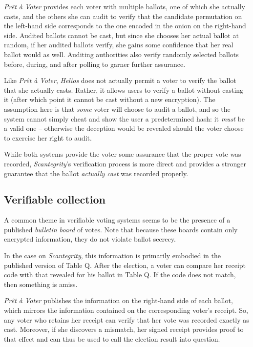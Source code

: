 \documentclass[10pt,twocolumn]{article}
\newcommand{\term}[1]{\textit{#1}}
\newcommand{\preta}{Pr\^{e}t \`{a}}
\newcommand{\pv}{\preta{} Voter}
\begin{document}
\term{\pv{}} provides each voter with multiple ballots, one of which she actually casts, and the others
she can audit to verify that the candidate permutation on the left-hand side corresponds to the one
encoded in the onion on the right-hand side. Audited ballots cannot be cast, but since she chooses
her actual ballot at random, if her audited ballots verify, she gains some confidence that
her real ballot would as well. Auditing authorities also verify randomly selected ballots before,
during, and after polling to garner further assurance.

Like \term{\pv{}}, \term{Helios} does not actually permit a voter to verify the ballot that she actually casts. Rather, it
allows users to verify a ballot without casting it (after which point it cannot be cast without
a new encryption). The assumption here is that \emph{some} voter will choose to audit a ballot, and
so the system cannot simply cheat and show the user a predetermined hash: it \emph{must} be a valid
one -- otherwise the deception would be revealed should the voter choose to exercise her right
to audit.

While both systems provide the voter some assurance that the proper vote was recorded, \term{Scantegrity}'s
verification process is more direct and provides a stronger guarantee that the ballot \emph{actually
cast} was recorded properly.

\subsection{Verifiable collection}

A common theme in verifiable voting systems seems to be the presence of a published \term{bulletin
board} of votes. Note that because these boards contain only encrypted information, they do not
violate ballot secrecy.

In the case on \term{Scantegrity}, this information is primarily embodied in the published version of Table
Q. After the election, a voter can compare her receipt code with that revealed for his ballot in
Table Q. If the code does not match, then something is amiss.

\term{\pv{}} publishes the information on the right-hand side of each ballot, which mirrors the information contained on the corresponding voter's receipt.
So, any voter who retains her receipt can verify that her vote was recorded exactly as cast.
Moreover, if she discovers a mismatch, her signed receipt provides proof to that effect and can thus be used to call
the election result into question.
\end{document}
